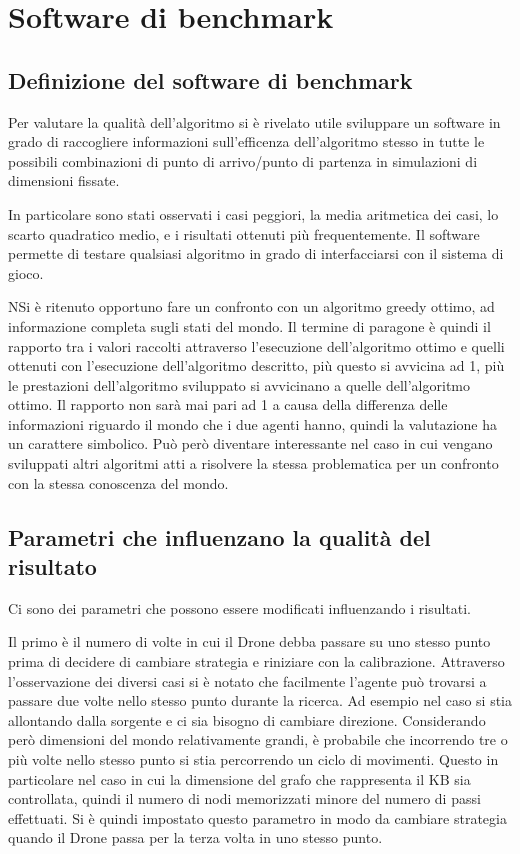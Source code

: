 \chapter{Software di benchmark}
\section{Definizione del software di benchmark}
Per valutare la qualità dell'algoritmo si è rivelato utile sviluppare un software in grado di raccogliere informazioni sull'efficenza dell'algoritmo stesso in tutte le possibili combinazioni di punto di arrivo/punto di partenza in simulazioni di dimensioni fissate. 

In particolare sono stati osservati i casi peggiori, la media aritmetica dei casi, lo scarto quadratico medio, e i risultati ottenuti più frequentemente. Il software permette di testare qualsiasi algoritmo in grado di interfacciarsi con il sistema di gioco. 

NSi è ritenuto opportuno fare un confronto con un algoritmo greedy ottimo, ad informazione completa sugli stati del mondo. Il termine di paragone è quindi il rapporto tra i valori raccolti attraverso l'esecuzione dell'algoritmo ottimo e quelli ottenuti con l'esecuzione dell'algoritmo descritto, più questo si avvicina ad 1, più le prestazioni dell'algoritmo sviluppato si avvicinano a quelle dell'algoritmo ottimo. 
Il rapporto non sarà mai pari ad 1 a causa della differenza delle informazioni riguardo il mondo che i due agenti hanno, quindi la valutazione ha un carattere simbolico. Può però diventare interessante nel caso in cui vengano sviluppati altri algoritmi atti a risolvere la stessa problematica per un confronto con la stessa conoscenza del mondo.

\section{Parametri che influenzano la qualità del risultato}
Ci sono dei parametri che possono essere modificati influenzando i risultati. 

Il primo è il numero di volte in cui il Drone debba passare su uno stesso punto prima di decidere di cambiare strategia e riniziare con la calibrazione. Attraverso l'osservazione dei diversi casi si è notato che facilmente l'agente può trovarsi a passare due volte nello stesso punto durante la ricerca. Ad esempio nel caso si stia allontando dalla sorgente e ci sia bisogno di cambiare direzione. Considerando però dimensioni del mondo relativamente grandi, è probabile che incorrendo tre o più volte nello stesso punto si stia percorrendo un ciclo di movimenti. Questo in particolare nel caso in cui la dimensione del grafo che rappresenta il KB  sia controllata, quindi il numero di nodi memorizzati minore del numero di passi effettuati. Si è quindi impostato questo parametro in modo da cambiare strategia quando il Drone passa per la terza volta in uno stesso punto.

